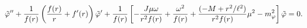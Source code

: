 \begin{equation}
{\tilde \varphi}''
+ {1 \over f(r)} \left ( {f(r) \over r} + f'(r) \right ) {\tilde \varphi}'
+ {1 \over f(r)} \left [
-{{J \mu \omega} \over {r^2 f(r)}}
+{\omega^2 \over f(r)}
+{(-M+{r^2 /\ell^2)} \over r^2 f(r)} \mu^2 - m_\varphi^2
\right ] \tilde \varphi
=0.
\label{eq_norm}
\end{equation}

